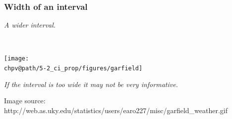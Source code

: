 \documentclass[t,compress,mathserif]{beamer}
\makeatletter
\newcommand{\soln}[1]{\textit{#1}}
\def\chpv@path{../../Chp 5}
\makeatother
\begin{document}
\begin{frame}
\frametitle{Width of an interval}


\pause

\soln{A wider interval.}

$\:$ \\

\pause

\begin{center}
\texttt{[image: \\chpv@path/5-2\_ci\_prop/figures/garfield]}
\end{center}

\pause

\soln{If the interval is too wide it may not be very informative.}

{\scriptsize Image source: http://web.as.uky.edu/statistics/users/earo227/misc/garfield\_weather.gif}

\end{frame}









\end{document}
